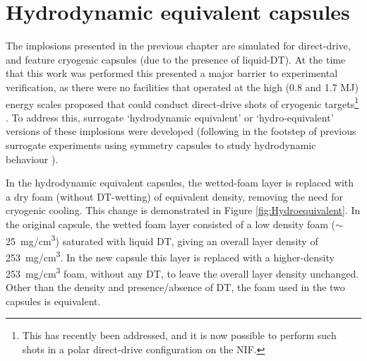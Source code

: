 



\section{Hydrodynamic equivalent capsules} \label{sec:Hydroequivalent}
The implosions presented in the previous chapter are simulated for direct-drive, and feature cryogenic capsules (due to the presence of liquid-DT). At the time that this work was performed this presented a major barrier to experimental verification, as there were no facilities that operated at the high (0.8 and 1.7 MJ) energy scales proposed that could conduct direct-drive shots of cryogenic targets\footnote{This has recently been addressed, and it is now possible to perform such shots in a polar direct-drive configuration on the NIF.} \cite{Hohenberger2015}. To address this, surrogate `hydrodynamic equivalent' or `hydro-equivalent' versions of these implosions were developed (following in the footstep of previous surrogate experiments using symmetry capsules to study hydrodynamic behaviour \cite{Weber2016}). 

In the hydrodynamic equivalent capsules, the wetted-foam layer is replaced with a dry foam (without DT-wetting) of equivalent density, removing the need for cryogenic cooling. This change is demonstrated in Figure \ref{fig:Hydroequivalent}. In the original capsule, the wetted foam layer consisted of a low density foam ($\sim$25~\si[per-mode=symbol]{\milli\gram\per\centi\meter\cubed}) saturated with liquid DT, giving an overall layer density of 253~\si[per-mode=symbol]{\milli\gram\per\centi\meter\cubed}. In the new capsule this layer is replaced with a higher-density 253~\si[per-mode=symbol]{\milli\gram\per\centi\meter\cubed} foam, without any DT, to leave the overall layer density unchanged. Other than the density and presence/absence of DT, the foam used in the two capsules is equivalent.

